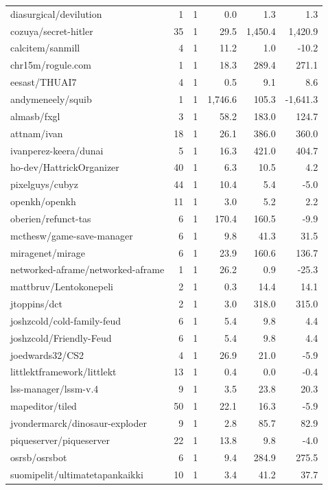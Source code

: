 \begin{center}
{\begin{longtable}{@{}lrrrrr@{}}
diasurgical/devilution & 1 & 1 & 0.0 & 1.3 & 1.3 \\
cozuya/secret-hitler & 35 & 1 & 29.5 & 1,450.4 & 1,420.9 \\
calcitem/sanmill & 4 & 1 & 11.2 & 1.0 & -10.2 \\
chr15m/rogule.com & 1 & 1 & 18.3 & 289.4 & 271.1 \\
eesast/THUAI7 & 4 & 1 & 0.5 & 9.1 & 8.6 \\
andymeneely/squib & 1 & 1 & 1,746.6 & 105.3 & -1,641.3 \\
almasb/fxgl & 3 & 1 & 58.2 & 183.0 & 124.7 \\
attnam/ivan & 18 & 1 & 26.1 & 386.0 & 360.0 \\
ivanperez-keera/dunai & 5 & 1 & 16.3 & 421.0 & 404.7 \\
ho-dev/HattrickOrganizer & 40 & 1 & 6.3 & 10.5 & 4.2 \\
pixelguys/cubyz & 44 & 1 & 10.4 & 5.4 & -5.0 \\
openkh/openkh & 11 & 1 & 3.0 & 5.2 & 2.2 \\
oberien/refunct-tas & 6 & 1 & 170.4 & 160.5 & -9.9 \\
mcthesw/game-save-manager & 6 & 1 & 9.8 & 41.3 & 31.5 \\
miragenet/mirage & 6 & 1 & 23.9 & 160.6 & 136.7 \\
networked-aframe/networked-aframe & 1 & 1 & 26.2 & 0.9 & -25.3 \\
mattbruv/Lentokonepeli & 2 & 1 & 0.3 & 14.4 & 14.1 \\
jtoppins/dct & 2 & 1 & 3.0 & 318.0 & 315.0 \\
joshzcold/cold-family-feud & 6 & 1 & 5.4 & 9.8 & 4.4 \\
joshzcold/Friendly-Feud & 6 & 1 & 5.4 & 9.8 & 4.4 \\
joedwards32/CS2 & 4 & 1 & 26.9 & 21.0 & -5.9 \\
littlektframework/littlekt & 13 & 1 & 0.4 & 0.0 & -0.4 \\
lss-manager/lssm-v.4 & 9 & 1 & 3.5 & 23.8 & 20.3 \\
mapeditor/tiled & 50 & 1 & 22.1 & 16.3 & -5.9 \\
jvondermarck/dinosaur-exploder & 9 & 1 & 2.8 & 85.7 & 82.9 \\
piqueserver/piqueserver & 22 & 1 & 13.8 & 9.8 & -4.0 \\
osrsb/osrsbot & 6 & 1 & 9.4 & 284.9 & 275.5 \\
suomipelit/ultimatetapankaikki & 10 & 1 & 3.4 & 41.2 & 37.7 \\

\end{longtable}}
\end{center}
